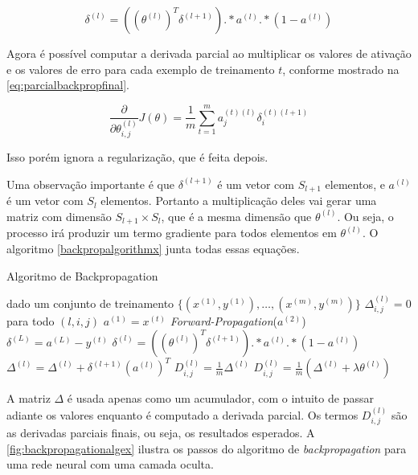\begin{equation}\label{eq:backpropagationfinal}
\delta^{(l)} = ((\theta^{(l)})^T \delta^{(l+1)}) .* a^{(l)} .* (1 - a^{(l)}) 
\end{equation}

Agora é possível computar a derivada parcial ao multiplicar os valores de ativação e os valores de erro para cada exemplo de treinamento $t$, conforme mostrado na \autoref{eq:parcialbackpropfinal}.

\begin{equation}\label{eq:parcialbackpropfinal}
\frac{\partial}{\partial\theta_{i,j}^{(l)}} J(\theta) = \frac{1}{m} \sum\limits_{t=1}^{m} a_j^{(t)(l)} \delta_i^{(t)(l+1)}
\end{equation}

Isso porém ignora a regularização, que é feita depois.

Uma observação importante é que $\delta^{(l+1)}$ é um vetor com $S_{l+1}$ elementos, e $a^{(l)}$ é um vetor com $S_l$ elementos. Portanto a multiplicação deles vai gerar uma matriz com dimensão $S_{l+1} \times S_l$, que é a mesma dimensão que $\theta^{(l)}$. Ou seja, o processo irá produzir um termo gradiente para todos elementos em $\theta^{(l)}$. O algoritmo \ref{backpropalgorithmx} junta todas essas equações.

\begin{algorithm} 
\caption{Algoritmo de Backpropagation} \label{backpropalgorithmx}
\begin{algorithmic}
	\State dado um conjunto de treinamento $\{(x^{(1)}, y^{(1)}), \ldots, (x^{(m)}, y^{(m)}) \}$
	\State $\Delta_{i,j}^{(l)} = 0$ para todo $(l, i, j)$
		\State $a^{(1)} = x^{(t)}$
		\State \textit{Forward-Propagation}($a^{(2)}$)
		\State $\delta^{(L)} = a^{(L)} - y^{(t)}$
      \State $\delta^{(l)} = ((\theta^{(l)})^T \delta^{(l+1)}) .* a^{(l)} .* (1 - a^{(l)})$
		  \State $\Delta^{(l)} = \Delta^{(l)} + \delta^{(l+1)}(a^{(l)})^T $
    \EndFor
	\EndFor
			\State $D_{i,j}^{(l)} = \frac{1}{m}\Delta^{(l)}$
		\Else
			\State $D_{i,j}^{(l)} = \frac{1}{m}(\Delta^{(l)} + \lambda\theta^{(l)})$
		\EndIf
\EndProcedure
\end{algorithmic}
\end{algorithm}

A matriz $\Delta$ é usada apenas como um acumulador, com o intuito de passar adiante os valores enquanto é computado a derivada parcial. Os termos $D_{i,j}^{(l)}$ são as derivadas parciais finais, ou seja, os resultados esperados. A \autoref{fig:backpropagationalgex} ilustra os passos do algoritmo de \textit{backpropagation} para uma rede neural com uma camada oculta.

